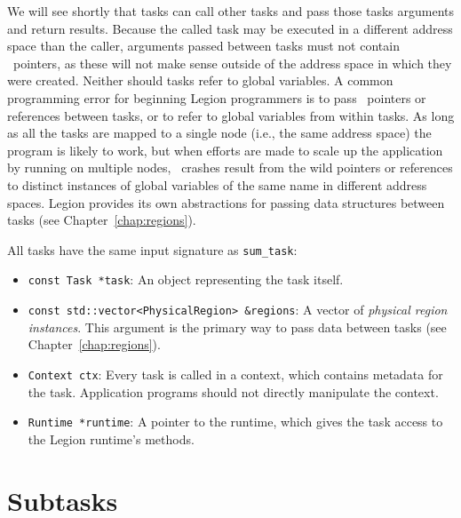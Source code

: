 We will see shortly that tasks can call other tasks and pass
those tasks arguments and return results.  Because the called task may
be executed in a different address space than the caller, arguments
passed between tasks must not contain \Cpp\ pointers, as these will
not make sense outside of the address space in which they were
created.  Neither should tasks refer to global variables. A common
programming error for beginning Legion programmers is to pass
\Cpp\ pointers or references between tasks, or to refer to global
variables from within tasks.  As long as all the tasks are mapped to a
single node (i.e., the same address space) the program is likely to
work, but when efforts are made to scale up the application by running
on multiple nodes, \Cpp\ crashes result from the wild pointers or
references to distinct instances of global variables of the same name
in different address spaces.  Legion provides its own abstractions for
passing data structures between tasks (see
Chapter~\ref{chap:regions}).

All tasks have the same input signature as {\tt sum\_task}:
\begin{itemize}

\item {\tt const Task *task}: An object representing the task itself. 

\item {\tt const std::vector<PhysicalRegion> \&regions}: A vector of {\em physical region instances}.  This argument is the
primary way to pass data between tasks (see Chapter~\ref{chap:regions}).

\item {\tt Context ctx}: Every task is called in a context, which contains metadata for the task.  Application programs
should not directly manipulate the context.

\item {\tt Runtime *runtime}: A pointer to the runtime, which gives the task access to the Legion runtime's methods.

\end{itemize}

\section{Subtasks}
\label{sec:subtasks}


\begin{figure}

\caption{}
\label{fig:subtask}
\end{figure}



